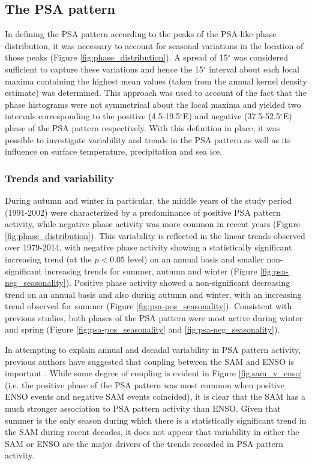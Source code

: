 \subsection{The PSA pattern}\label{s:psa_results}

In defining the PSA pattern according to the peaks of the PSA-like phase distribution, it was necessary to account for seasonal variations in the location of those peaks (Figure \ref{fig:phase_distribution}). A spread of 15$^{\circ}$ was considered sufficient to capture these variations and hence the 15$^{\circ}$ interval about each local maxima containing the highest mean values (taken from the annual kernel density estimate) was determined. This approach was used to account of the fact that the phase histograms were not symmetrical about the local maxima and yielded two intervals corresponding to the positive (4.5-19.5$^{\circ}$E) and negative (37.5-52.5$^{\circ}$E) phase of the PSA pattern respectively. With this definition in place, it was possible to investigate variability and trends in the PSA pattern as well as its influence on surface temperature, precipitation and sea ice. 

\subsubsection{Trends and variability}

During autumn and winter in particular, the middle years of the study period (1991-2002) were characterized by a predominance of positive PSA pattern activity, while negative phase activity was more common in recent years (Figure \ref{fig:phase_distribution}). This variability is reflected in the linear trends observed over 1979-2014, with negative phase activity showing a statistically significant increasing trend (at the $p < 0.05$ level) on an annual basis and smaller non-significant increasing trends for summer, autumn and winter (Figure \ref{fig:psa-neg_seasonality}). Positive phase activity showed a non-significant decreasing trend on an annual basis and also during autumn and winter, with an increasing trend observed for summer (Figure \ref{fig:psa-pos_seasonality}). Consistent with previous studies, both phases of the PSA pattern were most active during winter and spring (Figure \ref{fig:psa-pos_seasonality} and \ref{fig:psa-neg_seasonality}). 

In attempting to explain annual and decadal variability in PSA pattern activity, previous authors have suggested that coupling between the SAM and ENSO is important \citep[e.g.][]{Fogt2006}. While some degree of coupling is evident in Figure \ref{fig:sam_v_enso} (i.e. the positive phase of the PSA pattern was most common when positive ENSO events and negative SAM events coincided), it is clear that the SAM has a much stronger association to PSA pattern activity than ENSO. Given that summer is the only season during which there is a statistically significant trend in the SAM during recent decades, it does not appear that variability in either the SAM or ENSO are the major drivers of the trends recorded in PSA pattern activity.



